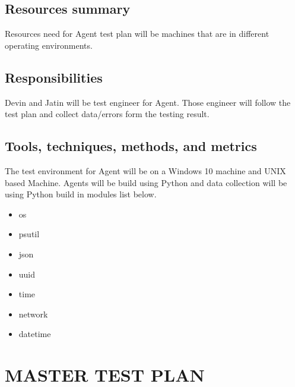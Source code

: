 \documentclass[letterpaper,12pt,oneside,listof=totoc]{scrreprt}
\begin{document}
\section{Resources summary}

Resources need for Agent test plan will be machines that are in different operating environments. 


\section{Responsibilities}


Devin and Jatin will be test engineer for Agent. Those engineer will follow the test plan and collect data/errors form the testing result. 

\section{Tools, techniques, methods, and metrics}


The test environment for Agent will be on a Windows 10 machine and UNIX based Machine. Agents will be build using Python and data collection will be using Python build in modules list below. 
\begin{multicols}{2}
\begin{itemize}
 \item os 
 \item psutil 
 \item json
 \item uuid 
 \item time
 \item network
 \item datetime 
 \end{itemize}
\end{multicols}





\chapter{MASTER TEST PLAN}
\end{document}
